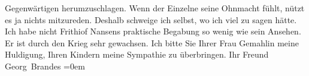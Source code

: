 \begin{ledgroupsized}[t]{13cm}
               Gegenwärtigen herumzuschlagen. Wenn der Einzelne seine Ohnmacht fühlt, nützt es ja
               nichts mitzureden. Deshalb schweige ich selbst, wo ich viel zu sagen hätte. Ich habe
               nicht Frithiof Nansens praktische Begabung so
               wenig wie sein Ansehen. Er ist durch den Krieg sehr gewachsen.\pend
           \pstart
           Ich bitte Sie Ihrer Frau Gemahlin meine Huldigung, Ihren Kindern meine Sympathie zu überbringen.\pend
           \pstart
           Ihr Freund{\\[\baselineskip]}\spacefill\mbox{Georg Brandes}\pend
           \leftskip=0em{}
         
         \endnumbering{}\end{ledgroupsized}  \newcommand{\dateiname}{L02373}\newcommand{\titel}{Georg Brandes an Arthur Schnitzler, 5. 1. 1922}\newcommand{\editorInnen}{Martin Anton Müller und Gerd-Hermann Susen}
      